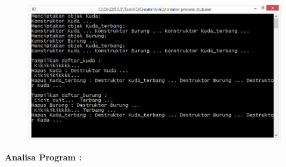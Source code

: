 \begin{figure}[htbp]
\centering
\includegraphics{images/capture9-1.png}
\caption{}
\end{figure}

\textbf{Analisa Program :}

